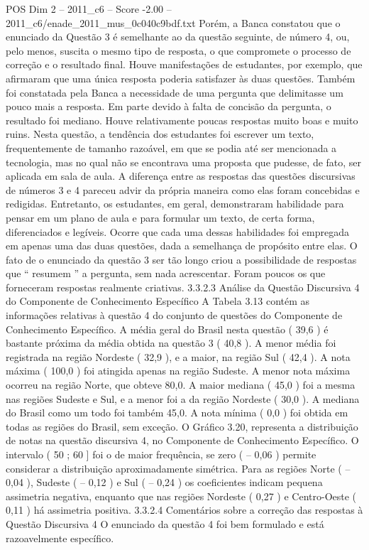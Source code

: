 \begin{textsample}{POS Dim 2 – 2011\_c6 – Score -2.00 – 2011\_c6/enade\_2011\_mus\_0c040c9bdf.txt}
Porém, a Banca constatou que o enunciado da Questão 3 é semelhante ao da questão seguinte, de número 4, ou, pelo menos, suscita o mesmo tipo de resposta, o que compromete o processo de correção e o resultado final.
Houve manifestações de estudantes, por exemplo, que afirmaram que uma única resposta poderia satisfazer às duas questões.
Também foi constatada pela Banca a necessidade de uma pergunta que delimitasse um pouco mais a resposta.
Em parte devido à falta de concisão da pergunta, o resultado foi mediano.
Houve relativamente poucas respostas muito boas e muito ruins.
Nesta questão, a tendência dos estudantes foi escrever um texto, frequentemente de tamanho razoável, em que se podia até ser mencionada a tecnologia, mas no qual não se encontrava uma proposta que pudesse, de fato, ser aplicada em sala de aula.
A diferença entre as respostas das questões discursivas de números 3 e 4 pareceu advir da própria maneira como elas foram concebidas e redigidas.
Entretanto, os estudantes, em geral, demonstraram habilidade para pensar em um plano de aula e para formular um texto, de certa forma, diferenciados e legíveis.
Ocorre que cada uma dessas habilidades foi empregada em apenas uma das duas questões, dada a semelhança de propósito entre elas.
O fato de o enunciado da questão 3 ser tão longo criou a possibilidade de respostas que “ resumem ” a pergunta, sem nada acrescentar.
Foram poucos os que forneceram respostas realmente criativas. 3.3.2.3 Análise da Questão Discursiva 4 do Componente de Conhecimento Específico A Tabela 3.13 contém as informações relativas à questão 4 do conjunto de questões do Componente de Conhecimento Específico.
A média geral do Brasil nesta questão ( 39,6 ) é bastante próxima da média obtida na questão 3 ( 40,8 ).
A menor média foi registrada na região Nordeste ( 32,9 ), e a maior, na região Sul ( 42,4 ).
A nota máxima ( 100,0 ) foi atingida apenas na região Sudeste.
A menor nota máxima ocorreu na região Norte, que obteve 80,0.
A maior mediana ( 45,0 ) foi a mesma nas regiões Sudeste e Sul, e a menor foi a da região Nordeste ( 30,0 ).
A mediana do Brasil como um todo foi também 45,0.
A nota mínima ( 0,0 ) foi obtida em todas as regiões do Brasil, sem exceção.
O Gráfico 3.20, representa a distribuição de notas na questão discursiva 4, no Componente de Conhecimento Específico.
O intervalo ( 50 ; 60 ] foi o de maior frequência, se zero ( – 0,06 ) permite considerar a distribuição aproximadamente simétrica.
Para as regiões Norte ( – 0,04 ), Sudeste ( – 0,12 ) e Sul ( – 0,24 ) os coeficientes indicam pequena assimetria negativa, enquanto que nas regiões Nordeste ( 0,27 ) e Centro-Oeste ( 0,11 ) há assimetria positiva. 3.3.2.4 Comentários sobre a correção das respostas à Questão Discursiva 4 O enunciado da questão 4 foi bem formulado e está razoavelmente específico.

\end{textsample}
